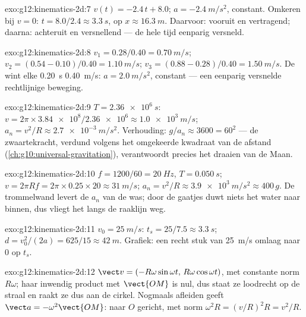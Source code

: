 \begin{solution}{exo:g12:kinematics-2d:7}
$v(t) = -2.4\,t + 8.0$; $a = \qty{-2.4}{m/s^2}$, constant. Omkeren bij
$v = 0$: $t = 8.0/2.4 \approx \qty{3.3}{s}$, op
$x \approx \qty{16.3}{m}$. Daarvoor: vooruit en vertragend; daarna:
achteruit en versnellend --- de hele tijd eenparig versneld.
\end{solution}

\begin{solution}{exo:g12:kinematics-2d:8}
$v_1 = 0.28/0.40 = \qty{0.70}{m/s}$;
$v_2 = (0.54 - 0.10)/0.40 = \qty{1.10}{m/s}$;
$v_3 = (0.88 - 0.28)/0.40 = \qty{1.50}{m/s}$. De  wint elke
\qty{0.20}{s} \qty{0.40}{m/s}: $a = \qty{2.0}{m/s^2}$, constant --- een
eenparig versnelde rechtlijnige beweging.
\end{solution}

\begin{solution}{exo:g12:kinematics-2d:9}
$T = \qty{2.36e6}{s}$: $v = 2\pi \times \num{3.84e8}/\num{2.36e6} \approx
\qty{1.0e3}{m/s}$; $a_n = v^2/R \approx \qty{2.7e-3}{m/s^2}$.
Verhouding: $g/a_n \approx 3600 = 60^2$ --- de zwaartekracht, verdund
volgens het omgekeerde kwadraat van de afstand
(\cref{ch:g10:universal-gravitation}), verantwoordt precies het draaien
van de Maan.
\end{solution}

\begin{solution}{exo:g12:kinematics-2d:10}
$f = 1200/60 = \qty{20}{Hz}$, $T = \qty{0.050}{s}$;
$v = 2\pi R f = 2\pi \times 0.25 \times 20 \approx \qty{31}{m/s}$;
$a_n = v^2/R \approx \qty{3.9e3}{m/s^2} \approx 400\,g$. De trommelwand
levert de $a_n$ van de was; door de gaatjes duwt niets het water naar
binnen, dus vliegt het langs de raaklijn weg.
\end{solution}

\begin{solution}{exo:g12:kinematics-2d:11}
$v_0 = \qty{25}{m/s}$: $t_s = 25/7.5 \approx \qty{3.3}{s}$;
$d = v_0^2/(2a) = 625/15 \approx \qty{42}{m}$. Grafiek: een recht stuk van
\qty{25}{m/s} omlaag naar $0$ op $t_s$.
\end{solution}

\begin{solution}{exo:g12:kinematics-2d:12}
$\vect v = (-R\omega\sin\omega t,\, R\omega\cos\omega t)$, met constante
norm $R\omega$; haar inwendig product met $\vect{OM}$ is nul, dus staat ze
loodrecht op de straal en raakt ze dus aan de cirkel. Nogmaals afleiden
geeft $\vect a = -\omega^2\vect{OM}$: naar $O$ gericht, met norm
$\omega^2 R = (v/R)^2 R = v^2/R$.
\end{solution}

